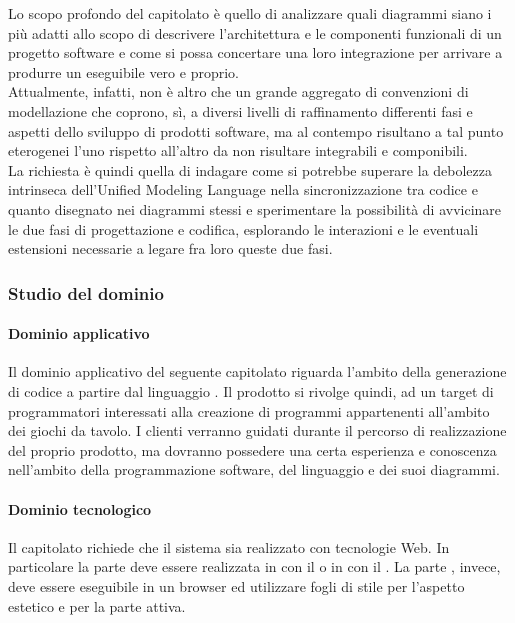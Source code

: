 		
		Lo scopo profondo del capitolato è quello di analizzare quali diagrammi  siano i più adatti allo scopo di descrivere l'architettura 
		e le componenti funzionali di un progetto software e come si possa concertare una loro integrazione per arrivare a produrre un eseguibile vero e proprio. 
		\\Attualmente, infatti,  non è altro che un grande aggregato di convenzioni di modellazione che coprono, sì, a diversi livelli di raffinamento differenti 
		fasi e aspetti dello sviluppo di prodotti software, ma al contempo risultano a tal punto eterogenei l'uno rispetto all'altro da non risultare integrabili e componibili. 
		\\La richiesta è quindi quella di indagare come si potrebbe superare la debolezza intrinseca dell'Unified Modeling Language nella sincronizzazione tra 
		codice e quanto disegnato nei diagrammi stessi e sperimentare la possibilità di avvicinare le due fasi di progettazione e codifica, esplorando le 
		interazioni e le eventuali estensioni necessarie a legare fra loro queste due fasi.
		\subsubsection{Studio del dominio}
			\paragraph{Dominio applicativo} Il dominio applicativo del seguente capitolato riguarda l'ambito della generazione di codice a partire dal linguaggio . Il prodotto si rivolge quindi, ad un target di programmatori interessati alla creazione di programmi appartenenti all'ambito dei giochi da tavolo. I clienti verranno guidati durante il percorso di realizzazione del proprio prodotto, ma dovranno possedere una certa esperienza e conoscenza nell'ambito della programmazione software, del linguaggio  e dei suoi diagrammi.
			
			\paragraph{Dominio tecnologico}
			Il capitolato richiede che il sistema sia realizzato con tecnologie Web. In particolare la parte  deve essere realizzata in  con il  
			 o in  con il  . La parte , invece, deve essere eseguibile in un browser  ed utilizzare fogli di stile  per 
			l'aspetto estetico e  per la parte attiva.
		
